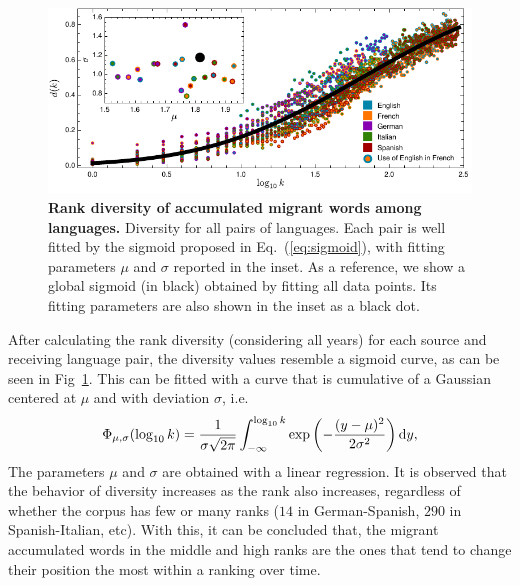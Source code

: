 \documentclass[10pt,letterpaper]{article} %
\newcommand{\eref}[1]{Eq.~(\ref{#1})}
\begin{document}
\begin{figure} %
\centering
\includegraphics[scale=1]{images/Diversity.pdf}
\caption{{\bf Rank diversity of accumulated migrant words among languages.} 
Diversity for all pairs of languages. Each pair is well fitted by the 
sigmoid proposed in \eref{eq:sigmoid}, with fitting parameters $\mu$ and $\sigma$
reported in the inset. As a reference, we show a global sigmoid (in black)
obtained by fitting all data points. Its fitting parameters are also shown in the
inset as a black dot. 
% 
% 
% 
}
\label{fig.DR_art}
\end{figure} %
After calculating the rank diversity (considering all years) for each source and receiving
language pair, the diversity values resemble a sigmoid curve, as can be
seen in Fig~\ref{fig.DR_art}. This can be fitted with a curve that is
cumulative of a Gaussian centered at $\mu$ and with 
deviation $\sigma$, i.e.  
\begin{equation}
\Phi_{\mu,\sigma}(\log_{10} k)=\frac{1}{\sigma\sqrt{2\pi}}
   \int_{-\infty}^{\log_{10}k}\exp\left(-\frac{(y-\mu)^2}{2\sigma^2}\right) {\rm d} y,
   \label{eq:sigmoid}
\end{equation}
The parameters $\mu$ and $\sigma$
are obtained with a linear regression. 
It is observed that the behavior of
diversity increases as the rank also increases, regardless of whether the
corpus has few or many ranks ($14$ in German-Spanish, $290$ in Spanish-Italian,
etc). With this, it can be concluded that, the migrant accumulated words in the
middle and high ranks are the ones that tend to change their position the most
within a ranking over time.
\end{document}
